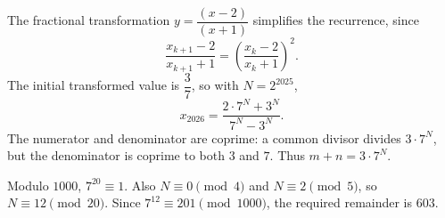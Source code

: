 The fractional transformation $y=\dfrac{(x-2)}{(x+1)}$ simplifies the recurrence, since
\[
\dfrac{x_{k+1}-2}{x_{k+1}+1}
=\left(\dfrac{x_k-2}{x_k+1}\right)^2.
\]
The initial transformed value is $\dfrac{3}{7}$, so with $N=2^{2025}$,
\[
x_{2026}=\dfrac{2\cdot7^N+3^N}{7^N-3^N}.
\]
The numerator and denominator are coprime: a common divisor divides $3\cdot7^N$, but the denominator is coprime to both $3$ and $7$. Thus $m+n=3\cdot7^N$.

Modulo $1000$, $7^{20}\equiv1$. Also $N\equiv0\pmod4$ and $N\equiv2\pmod5$, so $N\equiv12\pmod{20}$. Since $7^{12}\equiv201\pmod{1000}$, the required remainder is $\boxed{603}$.
